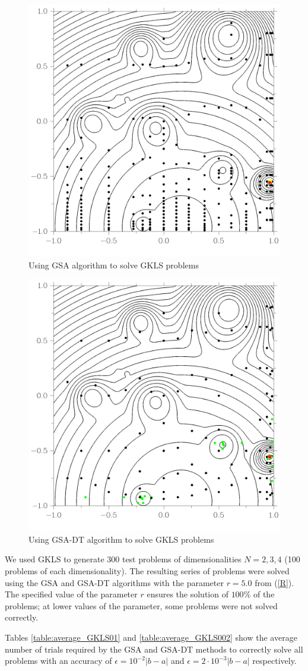 \documentclass[entropy,article,submit,moreauthors,pdftex]{Definitions/mdpi}
\begin{document}
\begin{figure}[H]
\includegraphics[width=0.6\linewidth]{GKLSAdaptiv6_30line.png}
\caption{Using GSA algorithm to solve GKLS problems}
\label{fig3}
\end{figure}   

\begin{figure}[H]
\includegraphics[width=0.6\linewidth]{GKLSTree6_30line.png}
\caption{Using GSA-DT algorithm to solve GKLS problems}
\label{fig4}
\end{figure}   

We used GKLS to generate 300 test problems of dimensionalities $N=2,3,4$ (100 problems of each dimensionality).
The resulting series of problems were solved using the GSA and GSA-DT algorithms with the parameter $r=5.0$ from (\ref{R}). The specified value of the parameter $r$ ensures the solution of  $100\%$ of the problems; at lower values of the parameter, some problems were not solved correctly.

Tables \ref{table:average_GKLS01} and \ref{table:average_GKLS002} show the average number of trials required by the GSA and GSA-DT methods to correctly solve all problems with an accuracy of $\epsilon = 10^{-2}\left|b-a\right|$ and $\epsilon = 2 \cdot 10^{-3}\left|b-a\right|$ respectively.
\end{document}
